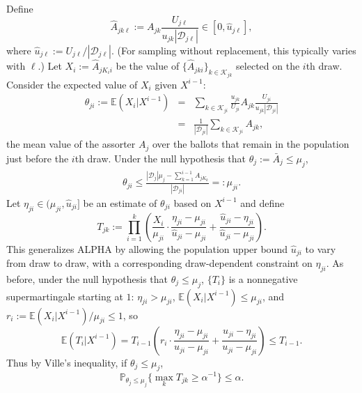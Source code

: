 \documentclass[aoas]{imsart}
\newcommand{\cD}{\ensuremath{\mathcal{D}}}
\newcommand{\mc}[1]{\ensuremath{\mathcal{#1}}}
\newcommand{\EE}{\mathbb{E}}
\renewcommand{\Pr}{\mathbb{P}}
\begin{document}
Define
\begin{equation}
    \hat{A}_{jk\ell} := A_{jk} \frac{U_{j\ell}}{u_{jk}|\cD_{j\ell}|} \in [0, \hat{u}_{j\ell}],
\end{equation}
where $\hat{u}_{j\ell} := U_{j\ell}/|\cD_{j\ell}|$.
(For sampling without replacement, this typically varies with $\ell$.)
Let $X_i := \hat{A}_{jK_ii}$ be the value of $\{ \hat{A}_{jki}\}_{k \in \mc{K}_{jk}}$ selected on the $i$th draw.
Consider the expected value of $X_i$ given $X^{i-1}$:
\begin{eqnarray}
    \theta_{ji} := \mathbb{E} (X_i | X^{i-1} ) 
    &=&  \sum_{k \in \mc{K}_{ji}} \frac{u_{jk}}{U_{ji}} A_{jk} \frac{U_{ji}}{u_{jk}|\cD_{ji}|} \nonumber \\
    &=& \frac{1}{|\cD_{ji}|} \sum_{k \in \mc{K}_{ji}} A_{jk},
\end{eqnarray}
the mean value of the assorter $A_j$ over the ballots that remain in the population just before the $i$th draw.
Under the null hypothesis that $\theta_j := \bar{A}_j \le \mu_j$,
\begin{eqnarray}
  \theta_{ji} \le \frac{|\cD_j| \mu_j - \sum_{k=1}^{i-1} A_{jK_k}}{|\cD_{ji}|} =: \mu_{ji}.
\end{eqnarray}
Let $\eta_{ji} \in (\mu_{ji}, \hat{u}_{ji}]$ be an estimate of $\theta_{ji}$ based on $X^{i-1}$ and define
\begin{equation}
    T_{jk} := \prod_{i=1}^k \left ( \frac{X_i}{\mu_{ji}} \cdot \frac{\eta_{ji}-\mu_{ji}}{\hat{u}_{ji}-\mu_{ji}} +
     \frac{\hat{u}_{ji}-\eta_{ji}}{\hat{u}_{ji}-\mu_{ji}} \right ).
\end{equation}
This generalizes ALPHA by allowing the population upper bound $\hat{u}_{ji}$ to vary from draw to draw, with a corresponding
draw-dependent constraint on $\eta_{ji}$.
As before, under the null hypothesis that $\theta_j \le \mu_j$,
$\{T_i\}$ is a nonnegative supermartingale starting at $1$:
$\eta_{ji} > \mu_{ji}$,
$\EE (X_i | X^{i-1}) \le \mu_{ji}$, and $r_i := \EE (X_i | X^{i-1})/\mu_{ji} \le 1$, so
\begin{equation} \label{eq:supermartingale-batch}
    \EE (T_i | X^{i-1} ) = T_{i-1} \left ( r_i \cdot \frac{\eta_{ji}-\mu_{ji}}{u_{ji}-\mu_{ji}} + \frac{u_{ji}-\eta_{ji}}{u_{ji}-\mu_{ji}} \right ) \le T_{i-1}.
\end{equation}
Thus by Ville's inequality, if $\theta_j \le \mu_j$,
\begin{equation}
\Pr_{\theta_j \le \mu_j} \{ \max_k T_{jk} \ge \alpha^{-1} \} \le \alpha.
\end{equation}
\end{document}

